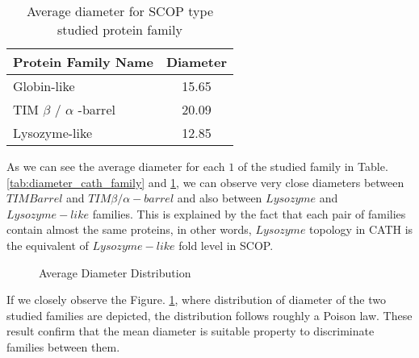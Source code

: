 \begin{table}
\centering
\begin {tabular}{ | l | c |}
\hline
Protein Family Name & Diameter \\ \hline
Globin-like & 15.65 \\ \hline
TIM $\beta$ / $\alpha$ -barrel & 20.09 \\ \hline
Lysozyme-like & 12.85 \\ \hline
\end {tabular}
\caption {Average diameter for SCOP type studied protein family}
\label {tab:diameter_scop_family}
\end{table}
As we can see the average diameter for each $1$ of the studied family in Table. \ref{tab:diameter_cath_family} and \ref{tab:diameter_scop_family}, we can observe very close diameters between $TIM Barrel$ and $TIM \beta/\alpha-barrel$ and also between $Lysozyme$ and $Lysozyme-like$ families. This is explained by the fact that each pair of families contain almost the same proteins, in  other words, $Lysozyme$ topology in CATH is the equivalent of $Lysozyme-like$ fold level in SCOP.
\begin{figure}
\centering
{}
\caption {Average Diameter Distribution}
\label {fig:diameter_distribution}
\end{figure}
If we closely observe the Figure. \ref{fig:diameter_distribution}, where distribution of diameter of the two studied families are depicted, the distribution follows roughly a Poison law. These result confirm that the mean diameter is suitable property to discriminate families between them.

